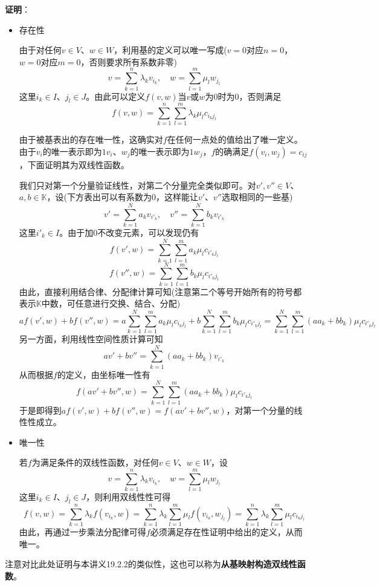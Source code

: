 \documentclass[a4paper,UTF8,fontset=windows,AutoFakeBold]{ctexart}
\newcommand*{\note}{\noindent *}
\newcommand{\proo}[1]{{\vspace{5pt}\kaishu\noindent\textbf{证明}：\vspace{-3pt}
\begin{compactitem}
    \item[] #1
\end{compactitem}
}}
\begin{document}
\proo{
    \begin{itemize}
        \item 存在性
        
        由于对任何$v\in V$、$w\in W$，利用基的定义可以唯一写成($v=0$对应$n=0$，$w=0$对应$m=0$，否则要求所有系数非零)
        $$v=\sum_{k=1}^n\lambda_kv_{i_k},\quad w=\sum_{l=1}^m\mu_lw_{j_l}$$
        这里$i_k\in I$、$j_l\in J$。由此可以定义$f(v,w)$当$v$或$w$为0时为0，否则满足
        $$f(v,w)=\sum_{k=1}^n\sum_{l=1}^m\lambda_k\mu_lc_{i_kj_l}$$

        由于被基表出的存在唯一性，这确实对$f$在任何一点处的值给出了唯一定义。由于$v_i$的唯一表示即为$1v_i$、$w_j$的唯一表示即为$1w_j$，$f$的确满足$f(v_i,w_j)=c_{ij}$，下面证明其为双线性函数。

        我们只对第一个分量验证线性，对第二个分量完全类似即可。对$v',v''\in V$、$a,b\in\mathbb{K}$，设(下方表出可以有系数为0，这样能让$v'$、$v''$选取相同的一些基)
        $$v'=\sum_{k=1}^Na_kv_{i'_k},\quad v''=\sum_{k=1}^Nb_kv_{i'_k}$$
        这里$i'_k\in I$。由于加0不改变元素，可以发现仍有
        $$f(v',w)=\sum_{k=1}^N\sum_{l=1}^ma_k\mu_lc_{i'_kj_l}$$
        $$f(v'',w)=\sum_{k=1}^N\sum_{l=1}^mb_k\mu_lc_{i'_kj_l}$$
        由此，直接利用结合律、分配律计算可知(注意第二个等号开始所有的符号都表示$\mathbb{K}$中数，可任意进行交换、结合、分配)
        $$a f(v',w)+b f(v'',w)=a\sum_{k=1}^N\sum_{l=1}^ma_k\mu_lc_{i_kj_l}+b\sum_{k=1}^N\sum_{l=1}^mb_k\mu_lc_{i'_kj_l}=\sum_{k=1}^N\sum_{l=1}^m(aa_k+bb_k)\mu_lc_{i'_kj_l}$$
        另一方面，利用线性空间性质计算可知
        $$av'+bv''=\sum_{k=1}^N(aa_k+bb_k)v_{i'_k}$$
        从而根据$f$的定义，由坐标唯一性有
        $$f(av'+bv'',w)=\sum_{k=1}^N\sum_{l=1}^m(aa_k+bb_k)\mu_lc_{i'_kj_l}$$
        于是即得到$a f(v',w)+b f(v'',w)=f(av'+bv'',w)$，对第一个分量的线性性成立。

        \item 唯一性
        
        若$f$为满足条件的双线性函数，对任何$v\in V$、$w\in W$，设
        $$v=\sum_{k=1}^n\lambda_kv_{i_k},\quad w=\sum_{l=1}^m\mu_lw_{j_l}$$
        这里$i_k\in I$、$j_l\in J$，则利用双线性性可得
        $$f(v,w)=\sum_{k=1}^n\lambda_kf(v_{i_k},w)=\sum_{k=1}^n\lambda_k\sum_{l=1}^m\mu_lf(v_{i_k},w_{j_l})=\sum_{k=1}^n\lambda_k\sum_{l=1}^m\mu_lc_{i_kj_l}$$
        由此，再通过一步乘法分配律可得$f$必须满足存在性证明中给出的定义，从而唯一。
    \end{itemize}
}

\note 注意对比此处证明与本讲义19.2.2的类似性，这也可以称为\textbf{从基映射构造双线性函数}。
\end{document}
